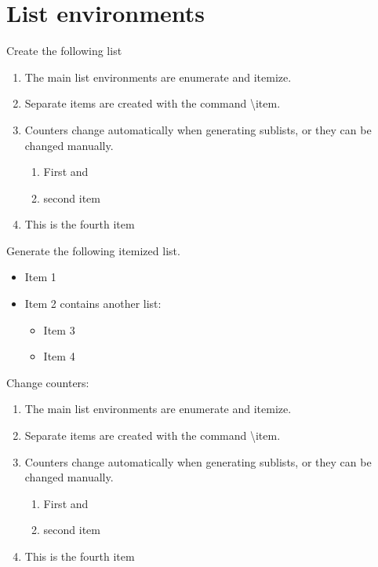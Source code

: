 \documentclass[11pt,reqno]{amsart}
\theoremstyle{plain}
\theoremstyle{definition}
\begin{document}
\section{List environments}\label{intro}

Create the following list

\begin{enumerate}
\item The main list environments are enumerate and itemize.

\item Separate items are created with the command \textbackslash{}item.

\item Counters change automatically when generating sublists, or they can be changed manually.
\begin{enumerate}

\item First and
\item second item
\end{enumerate}
\item This is the fourth item

\end{enumerate}
Generate the following itemized list.

\begin{itemize}

\item Item 1
\item Item 2 contains another list:

\begin{itemize}
\item Item 3
\item Item 4 
\end{itemize}
\end{itemize}

Change counters: 

\renewcommand{\theenumi}{(\Roman{enumi})}  %
\renewcommand{\labelenumi}{\theenumi}            %


\begin{enumerate}
\item The main list environments are enumerate and itemize.

\item Separate items are created with the command \textbackslash{}item.

\item Counters change automatically when generating sublists, or they can be changed manually.
\begin{enumerate}

\item First and
\item second item
\end{enumerate}
\item This is the fourth item

\end{enumerate}
\end{document}
